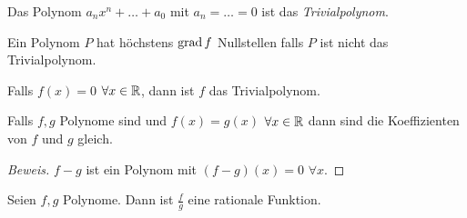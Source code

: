 Das Polynom $a_n x^n + \ldots + a_0$ mit $a_n= \ldots = 0$ ist das {\em Trivialpolynom}.

\begin{Kor}
  Ein Polynom $P$ hat höchstens $\operatorname{grad} f$ Nullstellen falls $P$ ist nicht das Trivialpolynom.
\end{Kor}



\begin{Kor}
  Falls $f(x)=0$ $\forall x\in\mathbb{R}$, dann ist $f$ das Trivialpolynom.
\end{Kor}
\begin{Kor}
  Falls $f,g$ Polynome sind und $f(x)=g(x)$ $\forall x\in\mathbb{R}$ dann sind die Koeffizienten von $f$ und $g$ gleich.
\end{Kor}
\begin{proof}[Beweis]
  $f-g$ ist ein Polynom mit $(f-g)(x)=0$ $\forall x$. 
\end{proof}
\begin{Def}
  Seien $f,g$ Polynome. Dann ist $\frac{f}{g}$ eine rationale Funktion.
\end{Def}
